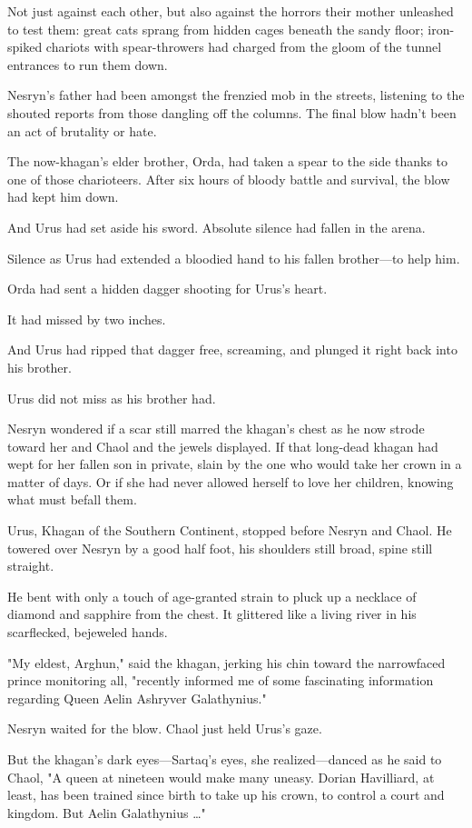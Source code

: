 Not just against each other, but also against the horrors their mother unleashed to test them: great cats sprang from hidden cages beneath the sandy floor; iron-spiked chariots with spear-throwers had charged from the gloom of the tunnel entrances to run them down.

Nesryn's father had been amongst the frenzied mob in the streets, listening to the shouted reports from those dangling off the columns.
The final blow hadn't been an act of brutality or hate.

The now-khagan's elder brother, Orda, had taken a spear to the side thanks to one of those charioteers.
After six hours of bloody battle and survival, the blow had kept him down.

And Urus had set aside his sword.
Absolute silence had fallen in the arena.

Silence as Urus had extended a bloodied hand to his fallen brother---to help him.

Orda had sent a hidden dagger shooting for Urus's heart.

It had missed by two inches.

And Urus had ripped that dagger free, screaming, and plunged it right back into his brother.

Urus did not miss as his brother had.

Nesryn wondered if a scar still marred the khagan's chest as he now strode toward her and Chaol and the jewels displayed.
If that long-dead khagan had wept for her fallen son in private, slain by the one who would take her crown in a matter of days.
Or if she had never allowed herself to love her children, knowing what must befall them.

Urus, Khagan of the Southern Continent, stopped before Nesryn and Chaol.
He towered over Nesryn by a good half foot, his shoulders still broad, spine still straight.

He bent with only a touch of age-granted strain to pluck up a necklace of diamond and sapphire from the chest.
It glittered like a living river in his scarflecked, bejeweled hands.

"My eldest, Arghun," said the khagan, jerking his chin toward the narrowfaced prince monitoring all, "recently informed me of some fascinating information regarding Queen Aelin Ashryver Galathynius."

Nesryn waited for the blow.
Chaol just held Urus's gaze.

But the khagan's dark eyes---Sartaq's eyes, she realized---danced as he said to Chaol, "A queen at nineteen would make many uneasy.
Dorian Havilliard, at least, has been trained since birth to take up his crown, to control a court and kingdom.
But Aelin Galathynius \ldots"

